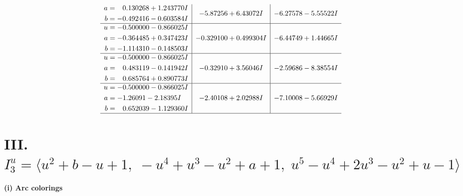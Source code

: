 \documentclass[1p]{elsarticle_modified}
\theoremstyle{definition}
\begin{document}
$$\begin{array}{c|c|c}
\begin{aligned}
a &= \phantom{-}0.130268 + 1.243770 I \\
b &= -0.492416 - 0.603584 I\end{aligned}
 & -5.87256 + 6.43072 I & -6.27578 - 5.55522 I \\ \hline\begin{aligned}
u &= -0.500000 - 0.866025 I \\
a &= -0.364485 + 0.347423 I \\
b &= -1.114310 - 0.148503 I\end{aligned}
 & -0.329100 + 0.499304 I & -6.44749 + 1.44665 I \\ \hline\begin{aligned}
u &= -0.500000 - 0.866025 I \\
a &= \phantom{-}0.483119 - 0.141942 I \\
b &= \phantom{-}0.685764 + 0.890773 I\end{aligned}
 & -0.32910 + 3.56046 I & -2.59686 - 8.38554 I \\ \hline\begin{aligned}
u &= -0.500000 - 0.866025 I \\
a &= -1.26091 - 2.18395 I \\
b &= \phantom{-}0.652039 - 1.129360 I\end{aligned}
 & -2.40108 + 2.02988 I & -7.10008 - 5.66929 I\\
 \hline 
 \end{array}$$\newpage\newpage\renewcommand{\arraystretch}{1}
\centering \section*{III. $I^u_{3}= \langle u^2+b- u+1,\;- u^4+u^3- u^2+a+1,\;u^5- u^4+2 u^3- u^2+u-1 \rangle$}
\flushleft \textbf{(i) Arc colorings}\\
\end{document}
